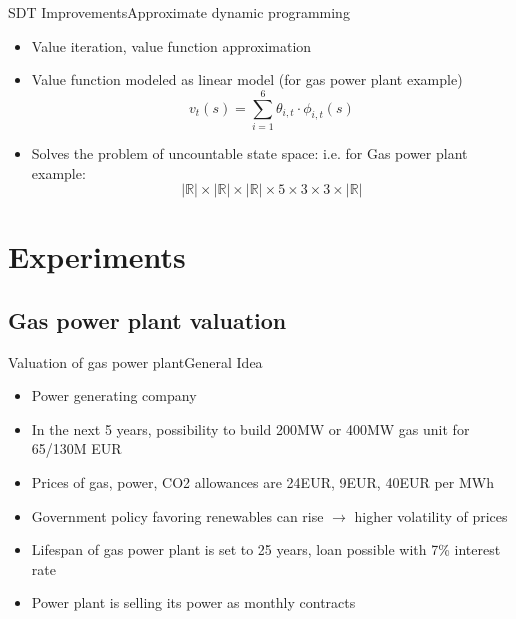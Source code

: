 \documentclass[us]{beamer}
\begin{document}
\begin{frame}{SDT Improvements}{Approximate dynamic programming}
		\begin{itemize}
			\item{Value iteration, value function approximation}
			\item{Value function modeled as linear model (for gas power plant example)}
			\begin{equation}
				v_t(s) = \sum_{i=1}^{6} \theta_{i,t} \cdot \phi_{i,t}(s)
			\end{equation}
			\item{Solves the problem of uncountable state space: i.e. for Gas power plant example:}
			\begin{equation}
				|\mathbb{R}| \times |\mathbb{R}| \times |\mathbb{R}| \times 5\times 3 \times 3 \times |\mathbb{R}|
			\end{equation}
		\end{itemize}
\end{frame}

\section{Experiments}


\subsection{Gas power plant valuation}
	
	
	\begin{frame}{Valuation of gas power plant}{General Idea}
	\begin{itemize}
		\item {Power generating company}
		\item {In the next 5 years, possibility to build 200MW or 400MW gas unit for 65/130M EUR}
		\item {Prices of gas, power, CO2 allowances are 24EUR, 9EUR, 40EUR per MWh}
		\item {Government policy favoring renewables can rise $\rightarrow$ higher volatility of prices}
		\item {Lifespan of gas power plant is set to 25 years, loan possible with 7\% interest rate}
		\item {Power plant is selling its power as monthly contracts}		
	\end{itemize}
	\end{frame}
\end{document}
